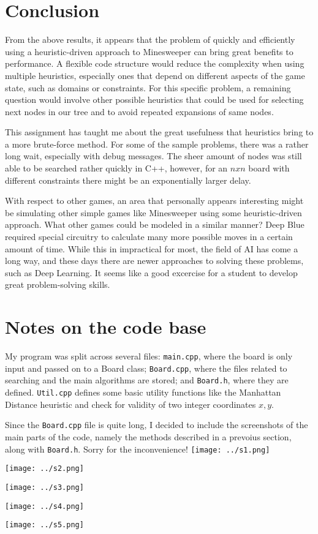 \documentclass{article}
\begin{document}
\section{Conclusion}
From the above results, it appears that the problem of quickly and efficiently using a heuristic-driven approach to Minesweeper can bring
great benefits to performance. A flexible code structure would reduce the complexity when using multiple heuristics, especially ones that
depend on different aspects of the game state, such as domains or constraints. For this specific problem, a remaining question would involve
other possible heuristics that could be used for selecting next nodes in our tree and to avoid repeated expansions of same nodes. 

This assignment has taught me about the great usefulness that heuristics bring to a more brute-force method. For some of the sample 
problems, there was a rather long wait, especially with debug messages. The sheer amount of nodes was still able to be searched rather
quickly in C++, however, for an $n x n$ board with different constraints there might be an exponentially larger delay.

With respect to other games, an area that personally appears interesting might be simulating other simple games like Minesweeper using some
heuristic-driven approach. What other games could be modeled in a similar manner? Deep Blue required special circuitry to calculate many more
possible moves in a certain amount of time. While this in impractical for most, the field of AI has come a long way, and these days there
are newer approaches to solving these problems, such as Deep Learning. It seems like a good excercise for a student to develop great 
problem-solving skills.

\section{Notes on the code base}
My program was split across several files: \texttt{main.cpp}, where the board is only input and passed on to a Board class; \texttt{Board.cpp}, 
where the files related to searching and the main algorithms are stored; and \texttt{Board.h}, where they are defined. \texttt{Util.cpp} defines 
some basic utility functions like the Manhattan Distance heuristic and check for validity of two integer coordinates $x,y$.

Since the \texttt{Board.cpp} file is quite long, I decided to include the screenshots of the main parts of the code, namely the methods described
in a prevoius section, along with \texttt{Board.h}. Sorry for the inconvenience!
\texttt{[image: ../s1.png]}

\texttt{[image: ../s2.png]}

\texttt{[image: ../s3.png]}

\texttt{[image: ../s4.png]}

\texttt{[image: ../s5.png]}
\end{document}
